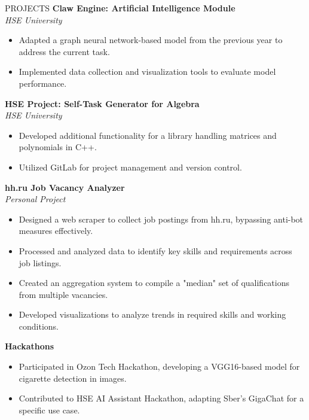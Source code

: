 \documentclass{resume} %
\begin{document}
\begin{rSection}{PROJECTS}
\textbf{Claw Engine: Artificial Intelligence Module} \\
\textit{HSE University} 
\begin{itemize}
    \itemsep -3pt {} 
    \item Adapted a graph neural network-based model from the previous year to address the current task.
    \item Implemented data collection and visualization tools to evaluate model performance.
\end{itemize}
\textbf{HSE Project: Self-Task Generator for Algebra} \\
\textit{HSE University} 
\begin{itemize}
    \itemsep -3pt {} 
    \item Developed additional functionality for a library handling matrices and polynomials in C++.
    \item Utilized GitLab for project management and version control.
\end{itemize}
\textbf{hh.ru Job Vacancy Analyzer} \\
\textit{Personal Project} 
\begin{itemize}
    \itemsep -3pt {} 
    \item Designed a web scraper to collect job postings from hh.ru, bypassing anti-bot measures effectively.
    \item Processed and analyzed data to identify key skills and requirements across job listings.
    \item Created an aggregation system to compile a "median" set of qualifications from multiple vacancies.
    \item Developed visualizations to analyze trends in required skills and working conditions.
\end{itemize}

\textbf{Hackathons}
\begin{itemize}
    \itemsep -3pt {} 
    \item Participated in Ozon Tech Hackathon, developing a VGG16-based model for cigarette detection in images.
    \item Contributed to HSE AI Assistant Hackathon, adapting Sber's GigaChat for a specific use case.
\end{itemize}
\end{rSection}
\end{document}
